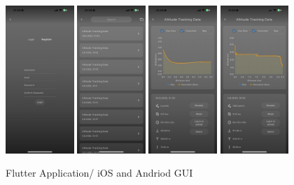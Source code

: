 \documentclass[12pt]{article}
\begin{document}
\begin{figure}[h!]
    \vspace{0.5em} %

    \includegraphics[width=0.23\textwidth]{Project_Screenshots/iOS-5.jpeg}
    \includegraphics[width=0.23\textwidth]{Project_Screenshots/iOS-6.jpeg}
    \includegraphics[width=0.23\textwidth]{Project_Screenshots/iOS-7.jpeg}
    \includegraphics[width=0.23\textwidth]{Project_Screenshots/iOS-8.jpeg}

    \caption{Flutter Application/ iOS and Andriod GUI}
\end{figure}
\end{document}
